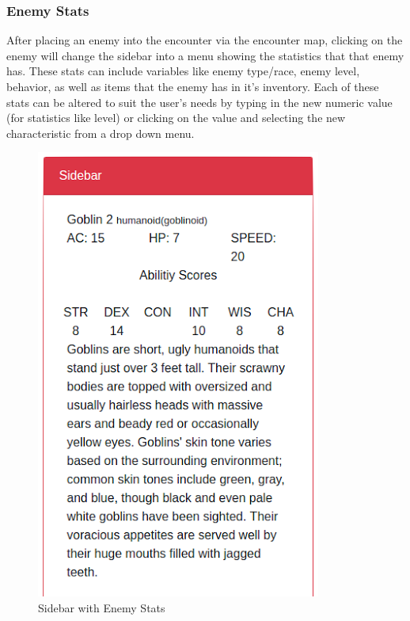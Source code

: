 \documentclass[12pt,a4paper]{report}
\begin{document}
			\subsubsection{Enemy Stats}
			After placing an enemy into the encounter via the encounter map, clicking on the enemy will change the sidebar into a menu showing the statistics that that enemy has. These stats can include variables like enemy type/race, enemy level, behavior, as well as items that the enemy has in it's inventory. Each of these stats can be altered to suit the user's needs by typing in the new numeric value (for statistics like level) or clicking on the value and selecting the new characteristic from a drop down menu.
			\bigskip
			\begin{figure}[H]
				\centering
				\includegraphics[scale=.7]{sidebarenemystats}
				\caption{Sidebar with Enemy Stats}
				\label{fig: Sidebar with Enemy Stats}
			\end{figure}
		\newpage
\end{document}
